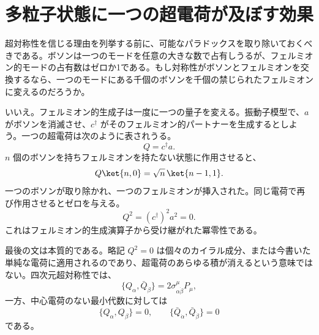 \section{多粒子状態に一つの超電荷が及ぼす効果}

超対称性を信じる理由を列挙する前に、可能なパラドックスを取り除いておくべきである。ボソンは一つのモードを任意の大きな数で占有しうるが、フェルミオン的モードの占有数はゼロか1である。もし対称性がボソンとフェルミオンを交換するなら、一つのモードにある千個のボソンを千個の禁じられたフェルミオンに変えるのだろうか。

いいえ。フェルミオン的生成子は一度に一つの量子を変える。振動子模型で、\(a\) がボソンを消滅させ、\(c^\dagger\) がそのフェルミオン的パートナーを生成するとしよう。一つの超電荷は次のように表されうる。
\begin{equation}
Q=c^\dagger a.
\end{equation}
\(n\) 個のボソンを持ちフェルミオンを持たない状態に作用させると、
\begin{equation}
Q\ket{n,0}
=\sqrt n\,\ket{n-1,1}.
\end{equation}
一つのボソンが取り除かれ、一つのフェルミオンが挿入された。同じ電荷で再び作用させるとゼロを与える。
\begin{equation}
Q^2=(c^\dagger)^2a^2=0.
\end{equation}
これはフェルミオン的生成演算子から受け継がれた冪零性である。

\begin{classroomqa}
\end{classroomqa}

最後の文は本質的である。略記 \(Q^2=0\) は個々のカイラル成分、または今書いた単純な電荷に適用されるのであり、超電荷のあらゆる積が消えるという意味ではない。四次元超対称性では、
\begin{equation}
\{Q_\alpha,\bar Q_{\dot\beta}\}
=2\sigma^\mu_{\alpha\dot\beta}P_\mu,
\end{equation}
一方、中心電荷のない最小代数に対しては
\begin{equation}
\{Q_\alpha,Q_\beta\}=0,
\qquad
\{\bar Q_{\dot\alpha},\bar Q_{\dot\beta}\}=0
\end{equation}
である。

